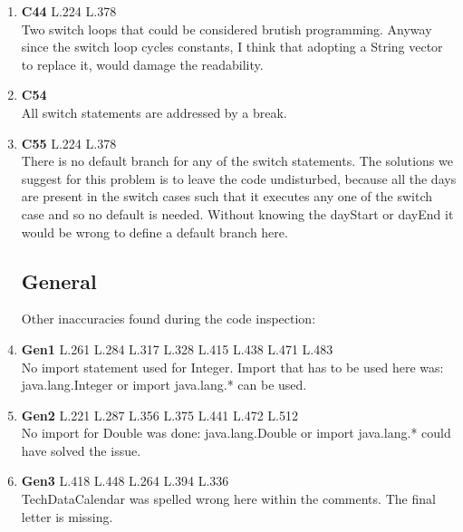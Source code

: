 \begin{enumerate}
	\item \textbf{C44} L.224 L.378 \\ Two switch loops that could be considered brutish programming. Anyway since the switch loop cycles constants, I think that adopting a String vector to replace it, would damage the readability.
	\item \textbf{C54} \\ All switch statements are addressed by a break.
	\item \textbf{C55} L.224 L.378 \\ There is no default branch for any of the switch statements. The solutions we suggest for this problem is to leave the code undisturbed, because all the days are present in the switch cases such that it executes any one of the switch case and so no default is needed. Without knowing the dayStart or dayEnd it would be wrong to define a default branch here.
	
\subsection{General}
Other inaccuracies found during the code inspection:

	\item \textbf{Gen1} L.261 L.284 L.317 L.328 L.415 L.438 L.471 L.483 \\ No import statement used for Integer. Import that has to be used here was: java.lang.Integer or import java.lang.* can be used.
	\item \textbf{Gen2} L.221 L.287 L.356 L.375 L.441 L.472 L.512 \\ No import for Double was done: java.lang.Double or import java.lang.* could have solved the issue.
	\item \textbf{Gen3} L.418 L.448 L.264 L.394 L.336 \\ TechDataCalendar was spelled wrong here within the comments. The final letter is missing.
\end{enumerate}